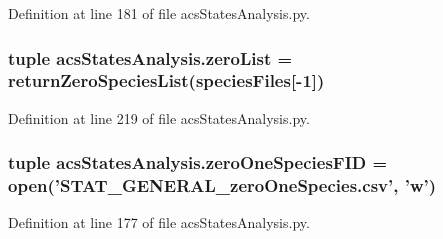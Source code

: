 Definition at line 181 of file acs\-States\-Analysis.\-py.

\hypertarget{a00130_ac2f9e6ead14745bd749a1ab8060cd4e7}{
\subsubsection[{zero\-List}]{\setlength{\rightskip}{0pt plus 5cm}tuple acs\-States\-Analysis.\-zero\-List = {\bf return\-Zero\-Species\-List}({\bf species\-Files}\mbox{[}-\/1\mbox{]})}}\label{a00130_ac2f9e6ead14745bd749a1ab8060cd4e7}


Definition at line 219 of file acs\-States\-Analysis.\-py.

\hypertarget{a00130_a3dc90aca8a97c5995b013887c98d8ce9}{
\subsubsection[{zero\-One\-Species\-F\-I\-D}]{\setlength{\rightskip}{0pt plus 5cm}tuple acs\-States\-Analysis.\-zero\-One\-Species\-F\-I\-D = open('S\-T\-A\-T\-\_\-\-G\-E\-N\-E\-R\-A\-L\-\_\-zero\-One\-Species.\-csv', 'w')}}\label{a00130_a3dc90aca8a97c5995b013887c98d8ce9}


Definition at line 177 of file acs\-States\-Analysis.\-py.

